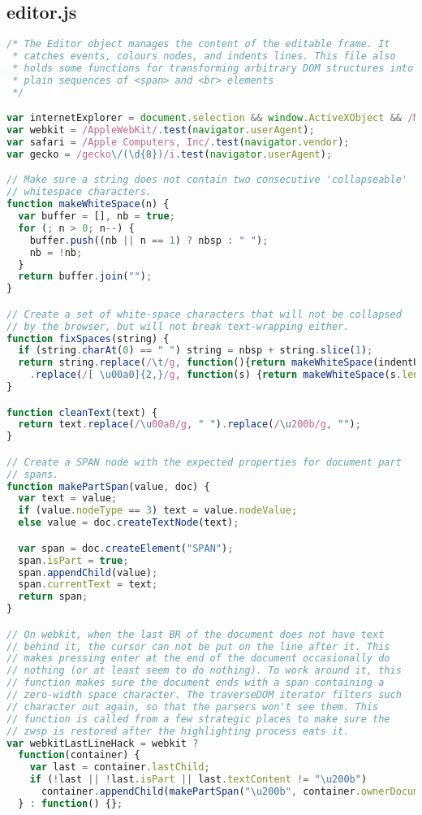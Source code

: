 \subsection{editor.js}
\begin{lstlisting}[language=Javascript]
/* The Editor object manages the content of the editable frame. It
 * catches events, colours nodes, and indents lines. This file also
 * holds some functions for transforming arbitrary DOM structures into
 * plain sequences of <span> and <br> elements
 */

var internetExplorer = document.selection && window.ActiveXObject && /MSIE/.test(navigator.userAgent);
var webkit = /AppleWebKit/.test(navigator.userAgent);
var safari = /Apple Computers, Inc/.test(navigator.vendor);
var gecko = /gecko\/(\d{8})/i.test(navigator.userAgent);

// Make sure a string does not contain two consecutive 'collapseable'
// whitespace characters.
function makeWhiteSpace(n) {
  var buffer = [], nb = true;
  for (; n > 0; n--) {
    buffer.push((nb || n == 1) ? nbsp : " ");
    nb = !nb;
  }
  return buffer.join("");
}

// Create a set of white-space characters that will not be collapsed
// by the browser, but will not break text-wrapping either.
function fixSpaces(string) {
  if (string.charAt(0) == " ") string = nbsp + string.slice(1);
  return string.replace(/\t/g, function(){return makeWhiteSpace(indentUnit);})
    .replace(/[ \u00a0]{2,}/g, function(s) {return makeWhiteSpace(s.length);});
}

function cleanText(text) {
  return text.replace(/\u00a0/g, " ").replace(/\u200b/g, "");
}

// Create a SPAN node with the expected properties for document part
// spans.
function makePartSpan(value, doc) {
  var text = value;
  if (value.nodeType == 3) text = value.nodeValue;
  else value = doc.createTextNode(text);

  var span = doc.createElement("SPAN");
  span.isPart = true;
  span.appendChild(value);
  span.currentText = text;
  return span;
}

// On webkit, when the last BR of the document does not have text
// behind it, the cursor can not be put on the line after it. This
// makes pressing enter at the end of the document occasionally do
// nothing (or at least seem to do nothing). To work around it, this
// function makes sure the document ends with a span containing a
// zero-width space character. The traverseDOM iterator filters such
// character out again, so that the parsers won't see them. This
// function is called from a few strategic places to make sure the
// zwsp is restored after the highlighting process eats it.
var webkitLastLineHack = webkit ?
  function(container) {
    var last = container.lastChild;
    if (!last || !last.isPart || last.textContent != "\u200b")
      container.appendChild(makePartSpan("\u200b", container.ownerDocument));
  } : function() {};


\end{lstlisting}
